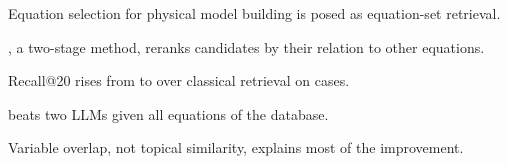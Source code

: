 \item Equation selection for physical model building is posed as equation-set retrieval.
\item \ours{}, a two-stage method, reranks candidates by their relation to other equations.
\item Recall@20 rises from \RecABase{} to \RecAProp{} over classical retrieval on \NCases{} cases.
\item \ours{} beats two LLMs given all \NEq{} equations of the database.
\item Variable overlap, not topical similarity, explains most of the improvement.
